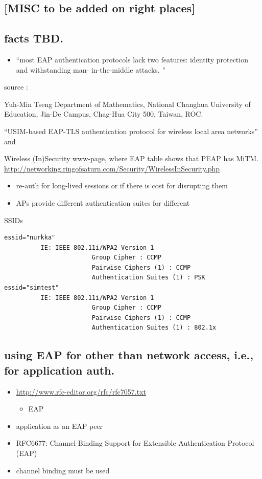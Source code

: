 \documentclass[12pt,a4paper,english]{tutthesis}
\begin{document}
\begin{otherlanguage}{english}
\chapter{[MISC to be added on right places]}
\label{sec-7}
\section{facts TBD.}
\label{sec-7-1}
\begin{itemize}
\item ``most EAP authentication protocols lack two features: identity
protection and withstanding man- in-the-middle attacks. ''
\end{itemize}
source :

Yuh-Min Tseng Department of Mathematics, National Changhua University of Education,
Jin-De Campus, Chag-Hua City 500, Taiwan, ROC.

``USIM-based EAP-TLS authentication protocol for
wireless local area networks''
and 

Wireless (In)Security www-page, where 
EAP table shows that PEAP has MiTM.
\url{http://networking.ringofsaturn.com/Security/WirelessInSecurity.php}

\begin{itemize}
\item re-auth for long-lived sessions or if there is cost for disrupting them
\item APs provide different authentication suites for different
\end{itemize}
SSIDs 
\begin{verbatim}
essid="nurkka"
          IE: IEEE 802.11i/WPA2 Version 1
                        Group Cipher : CCMP
                        Pairwise Ciphers (1) : CCMP
                        Authentication Suites (1) : PSK
essid="simtest"
          IE: IEEE 802.11i/WPA2 Version 1
                        Group Cipher : CCMP
                        Pairwise Ciphers (1) : CCMP
                        Authentication Suites (1) : 802.1x
\end{verbatim}
\section{using EAP for other than network access, i.e., for application auth.}
\label{sec-7-2}
\begin{itemize}
\item \url{http://www.rfc-editor.org/rfc/rfc7057.txt}
\begin{itemize}
\item EAP
\end{itemize}
\item application as an EAP peer
\item RFC6677: Channel-Binding Support for Extensible Authentication Protocol (EAP)
\item channel binding must be used
\end{itemize}


\end{otherlanguage}
\end{document}
